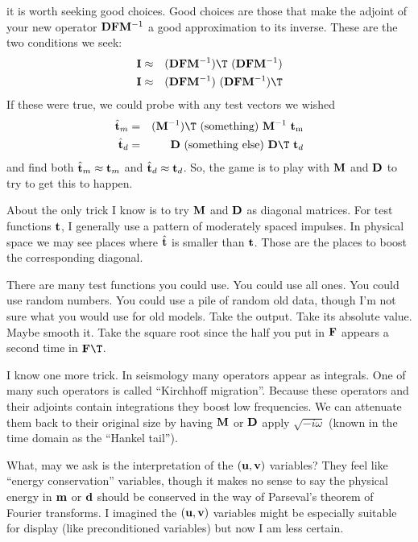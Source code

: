 it is worth seeking good choices.
Good choices are those
that make the adjoint of your new operator
$ \bold D \bold F \bold M^{-1}$
a good approximation to its inverse.
These are the two conditions we seek:
\begin{eqnarray}
\bold I &\approx &
(\bold D \bold F \bold M^{-1})\T \ 
(\bold D \bold F \bold M^{-1})
\\
\bold I &\approx &
(\bold D \bold F \bold M^{-1}) \ 
(\bold D \bold F \bold M^{-1})\T
\end{eqnarray}
If these were true, we could probe with any test vectors we wished
\begin{eqnarray}
\hat {\bold t}_m
&=&
(\bold M^{-1})\T \ (\rm something)\ \bold M^{-1}\ \bold t_m
\\
\hat {\bold t}_d
&=&
\bold D \ {(\rm something\ else)} \
\bold D\T \ \bold t_d
\end{eqnarray}
and find both $\hat {\bold t}_m\approx \bold t_m$
and  $\hat {\bold t}_d\approx \bold t_d$.
So, the game is to play with
$\bold M$ and $\bold D$
to try to get this to happen.
\par
About the only trick I know is to try $\bold M$ and $\bold D$ as diagonal matrices.
For test functions $\bold t$, I generally use a pattern of moderately spaced impulses.
In physical space we may see places where
$\hat {\bold t}$ is smaller than $\bold t$.
Those are the places to boost the corresponding diagonal.
\par
There are many test functions you could use.
You could use all ones.
You could use random numbers.
You could use a pile of random old data,
though I'm not sure what you would use for old models.
Take the output.
Take its absolute value.
Maybe smooth it.
Take the square root since the half you put in
$\bold F$ appears a second time in $\bold F\T$.
\par
I know one more trick.
In seismology many operators appear as integrals.
One of many such operators is called ``Kirchhoff migration''.
Because these operators and their adjoints contain integrations they boost low frequencies.
We can attenuate them back to their original size
by having $\bold M$ or $\bold D$ apply $\sqrt{-i\omega}$
(known in the time domain as the ``Hankel tail'').
%
\par
What, may we ask is the interpretation of the $(\bold u, \bold v)$ variables?
They feel like ``energy conservation'' variables, though it makes no sense
to say the physical energy in $\bold m$ or $\bold d$ should be conserved
in the way of Parseval's theorem of Fourier transforms.
I imagined the $(\bold u,\bold v)$ variables might be especially suitable for display
(like preconditioned variables) but now I am less certain.

